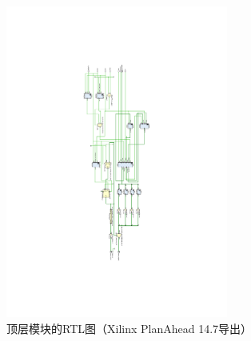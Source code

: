 \documentclass[10pt,a4paper,fleqn]{article}
\begin{document}
\begin{figure}[H]
  \centering
  \includegraphics[width=0.65\textwidth]{figure/topex.pdf}
  \caption{顶层模块的RTL图（Xilinx PlanAhead 14.7导出）}
\end{figure}
\newpage
\thispagestyle{empty}
\vspace{-2cm}
\end{document}
